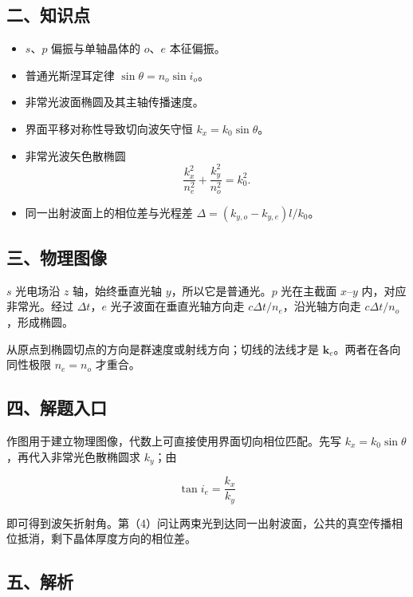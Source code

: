 \documentclass[12pt,a4paper,UTF8]{ctexart}
\newcommand{\tightlist}{\setlength{\itemsep}{0pt}\setlength{\parskip}{0pt}}
\begin{document}
\subsection{二、知识点}\label{ux4e8cux77e5ux8bc6ux70b9-6}

\begin{itemize}
\tightlist
\item
  \(s\)、\(p\) 偏振与单轴晶体的 \(o\)、\(e\) 本征偏振。
\item
  普通光斯涅耳定律 \(\sin\theta=n_o\sin i_o\)。
\item
  非常光波面椭圆及其主轴传播速度。
\item
  界面平移对称性导致切向波矢守恒 \(k_x=k_0\sin\theta\)。
\item
  非常光波矢色散椭圆 \[\frac{k_x^2}{n_e^2}+\frac{k_y^2}{n_o^2}=k_0^2.\]
\item
  同一出射波面上的相位差与光程差 \(\Delta=(k_{y,o}-k_{y,e})l/k_0\)。
\end{itemize}

\subsection{三、物理图像}\label{ux4e09ux7269ux7406ux56feux50cf-6}

\(s\) 光电场沿 \(z\) 轴，始终垂直光轴 \(y\)，所以它是普通光。\(p\)
光在主截面 \(x\)--\(y\) 内，对应非常光。经过 \(\Delta t\)，\(e\)
光子波面在垂直光轴方向走 \(c\Delta t/n_e\)，沿光轴方向走
\(c\Delta t/n_o\)，形成椭圆。

从原点到椭圆切点的方向是群速度或射线方向；切线的法线才是
\(\bm k_e\)。两者在各向同性极限 \(n_e=n_o\) 才重合。

\subsection{四、解题入口}\label{ux56dbux89e3ux9898ux5165ux53e3-6}

作图用于建立物理图像，代数上可直接使用界面切向相位匹配。先写
\(k_x=k_0\sin\theta\)，再代入非常光色散椭圆求 \(k_y\)；由

\[\tan i_e=\frac{k_x}{k_y}\]

即可得到波矢折射角。第（4）问让两束光到达同一出射波面，公共的真空传播相位抵消，剩下晶体厚度方向的相位差。

\subsection{五、解析}\label{ux4e94ux89e3ux6790-6}
\end{document}
